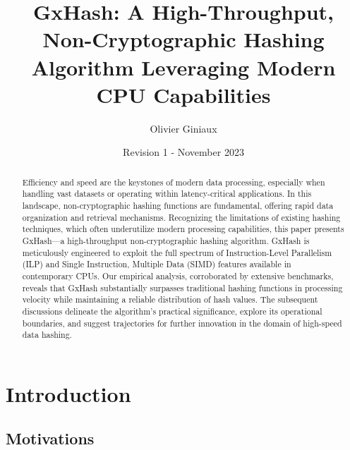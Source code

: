 \documentclass[10pt]{article}
\title{GxHash: A High-Throughput, Non-Cryptographic Hashing Algorithm Leveraging Modern CPU Capabilities}
\author{Olivier Giniaux}
\date{Revision 1 - November 2023}
\begin{document}
\maketitle

\begin{abstract}

Efficiency and speed are the keystones of modern data processing, especially when handling vast datasets or operating within latency-critical applications. In this landscape, non-cryptographic hashing functions are fundamental, offering rapid data organization and retrieval mechanisms. Recognizing the limitations of existing hashing techniques, which often underutilize modern processing capabilities, this paper presents GxHash—a high-throughput non-cryptographic hashing algorithm. GxHash is meticulously engineered to exploit the full spectrum of Instruction-Level Parallelism (ILP) and Single Instruction, Multiple Data (SIMD) features available in contemporary CPUs. Our empirical analysis, corroborated by extensive benchmarks, reveals that GxHash substantially surpasses traditional hashing functions in processing velocity while maintaining a reliable distribution of hash values. The subsequent discussions delineate the algorithm's practical significance, explore its operational boundaries, and suggest trajectories for further innovation in the domain of high-speed data hashing.

\end{abstract}

\begin{multicols}{2}
\tableofcontents
\end{multicols}

\clearpage
\section{Introduction}

\subsection{Motivations}
\end{document}

